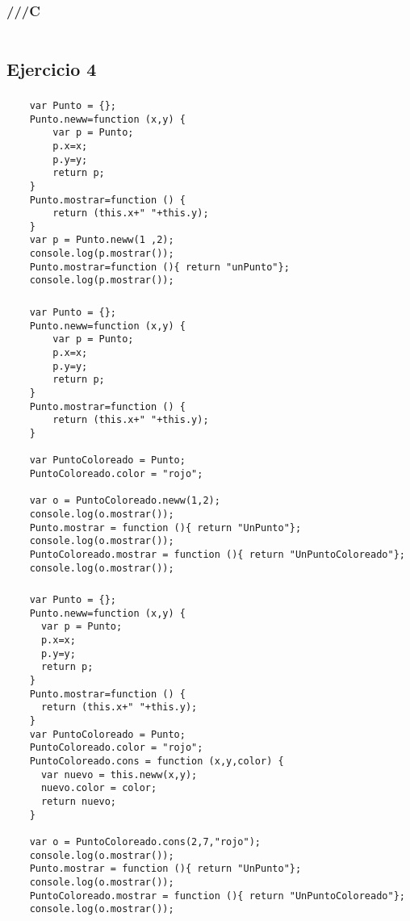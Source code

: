 \documentclass[10pt,a4paper]{article}
\begin{document}
\subsubsection{///C}
    \begin{lstlisting}
    \end{lstlisting}
\subsection{Ejercicio 4}
\subsubsection{}
    \begin{lstlisting}
    var Punto = {};
    Punto.neww=function (x,y) {
    	var p = Punto;
    	p.x=x;
    	p.y=y;
    	return p;
    }
    Punto.mostrar=function () {
    	return (this.x+" "+this.y);
    }
    var p = Punto.neww(1 ,2);
    console.log(p.mostrar());
    Punto.mostrar=function (){ return "unPunto"};
    console.log(p.mostrar());
    \end{lstlisting}

\subsubsection{}
    \begin{lstlisting}
    var Punto = {};
    Punto.neww=function (x,y) {
    	var p = Punto;
    	p.x=x;
    	p.y=y;
    	return p;
    }
    Punto.mostrar=function () {
    	return (this.x+" "+this.y);
    }
    
    var PuntoColoreado = Punto;
    PuntoColoreado.color = "rojo";
    
    var o = PuntoColoreado.neww(1,2);
    console.log(o.mostrar());
    Punto.mostrar = function (){ return "UnPunto"};
    console.log(o.mostrar());
    PuntoColoreado.mostrar = function (){ return "UnPuntoColoreado"};
    console.log(o.mostrar());
    \end{lstlisting}
\subsubsection{}
    \begin{lstlisting}
    var Punto = {};
    Punto.neww=function (x,y) {
      var p = Punto;
      p.x=x;
      p.y=y;
      return p;
    }
    Punto.mostrar=function () {
      return (this.x+" "+this.y);
    }
    var PuntoColoreado = Punto;
    PuntoColoreado.color = "rojo";
    PuntoColoreado.cons = function (x,y,color) {
      var nuevo = this.neww(x,y);
      nuevo.color = color;
      return nuevo;
    }

    var o = PuntoColoreado.cons(2,7,"rojo");
    console.log(o.mostrar());
    Punto.mostrar = function (){ return "UnPunto"};
    console.log(o.mostrar());
    PuntoColoreado.mostrar = function (){ return "UnPuntoColoreado"};
    console.log(o.mostrar());
    \end{lstlisting}
\end{document}
